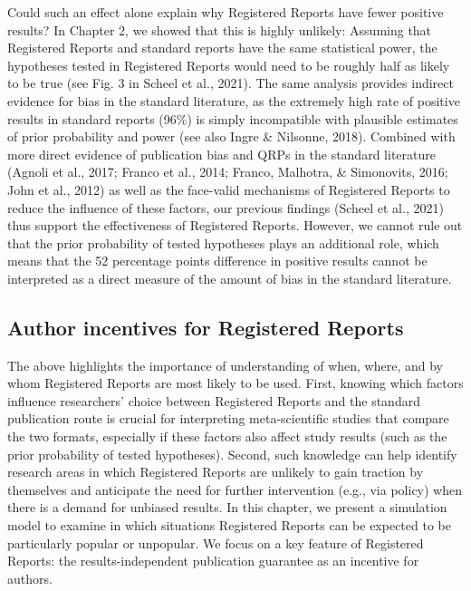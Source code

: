 \documentclass[
  ,man,mask,floatsintext]{apa6}
\begin{document}
Could such an effect alone explain why Registered Reports have fewer positive results?
In Chapter 2, we showed that this is highly unlikely:
Assuming that Registered Reports and standard reports have the same statistical power, the hypotheses tested in Registered Reports would need to be roughly half as likely to be true (see Fig. 3 in Scheel et al., 2021).
The same analysis provides indirect evidence for bias in the standard literature, as the extremely high rate of positive results in standard reports (96\%) is simply incompatible with plausible estimates of prior probability and power (see also Ingre \& Nilsonne, 2018).
Combined with more direct evidence of publication bias and QRPs in the standard literature (Agnoli et al., 2017; Franco et al., 2014; Franco, Malhotra, \& Simonovits, 2016; John et al., 2012)
as well as the face-valid mechanisms of Registered Reports to reduce the influence of these factors, our previous findings (Scheel et al., 2021) thus support the effectiveness of Registered Reports.
However, we cannot rule out that the prior probability of tested hypotheses plays an additional role, which means that the 52 percentage points difference in positive results cannot be interpreted as a direct measure of the amount of bias in the standard literature.

\hypertarget{author-incentives-for-registered-reports}{%
\subsection{Author incentives for Registered Reports}\label{author-incentives-for-registered-reports}}

The above highlights the importance of understanding of when, where, and by whom Registered Reports are most likely to be used.
First, knowing which factors influence researchers' choice between Registered Reports and the standard publication route is crucial for interpreting meta-scientific studies that compare the two formats, especially if these factors also affect study results (such as the prior probability of tested hypotheses).
Second, such knowledge can help identify research areas in which Registered Reports are unlikely to gain traction by themselves
and anticipate the need for further intervention (e.g., via policy) when there is a demand for unbiased results.
In this chapter, we present a simulation model to examine in which situations Registered Reports can be expected to be particularly popular or unpopular.
We focus on
a key feature of Registered Reports:
the results-independent publication guarantee as an incentive for authors.
\end{document}
